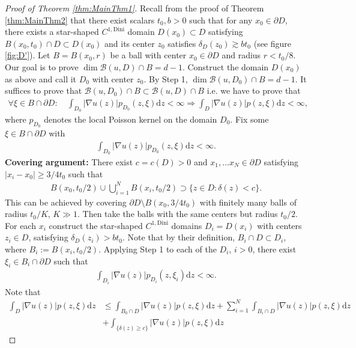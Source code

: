 \documentclass[10pt,a4paper]{amsart}
\begin{document}
\begin{proof}[Proof of Theorem \ref{thm:MainThm1}]
		Recall from the proof of Theorem \ref{thm:MainThm2} that there exist scalars $t_0,b>0$ such that for any $x_0\in\partial D$, there exists a star-shaped $C^{1,\mathrm{Dini}}$ domain $D(x_0)\subset D$ satisfying $B(x_0,t_0)\cap D\subset D(x_0)$ and its center $z_0$ satisfies $\delta_D(z_0)\gtrsim bt_0$ (see figure \ref{fig:D'}). Let $B=B(x_0,r)$ be a ball with center $x_0\in\partial D$ and radius $r<t_0/8$. Our goal is to prove $\dim\mathcal B(u,D)\cap B=d-1$. Construct the domain $D(x_0)$ as above and call it $D_0$ with center $z_0$. By Step 1, $\dim \mathcal B(u,D_0)\cap B=d-1$. It suffices to prove that $\mathcal B(u,D_0)\cap B\subset \mathcal B(u, D)\cap B$ i.e. we have to prove that
		\begin{align}
			\forall \xi\in B\cap\partial D:\quad\int_{D_0}|\nabla u(z)| p_{D_0}(z,\xi)\mathrm dz<\infty\Rightarrow\int_{D}|\nabla u(z)|p(z,\xi)\mathrm dz<\infty,
		\end{align}
		where $p_{D_0}$ denotes the local Poisson kernel on the domain $D_0$. Fix some $\xi\in B\cap\partial D$ with
		\begin{align*}
			\int_{D_0}|\nabla u(z)| p_{D_0}(z,\xi)\mathrm dz<\infty.
		\end{align*}
		\textbf{Covering argument: }There exist $c=c(D)>0$ and $x_1,\dots x_N\in\partial D$ satisfying $|x_i-x_0|\geq3/4t_0$ such that
		\begin{align}
			B(x_0,t_0/2)\cup\bigcup_{i=1}^N B(x_i,t_0/2)\supset \lbrace z\in D:\delta(z)<c\rbrace.
		\end{align}
		This can be achieved by covering $\partial D\setminus B(x_0,3/4t_0)$ with finitely many balls of radius $t_0/K$, $K\gg1$. Then take the balls with the same centers but radius $t_0/2$. For each $x_i$ construct the star-shaped $C^{1,\mathrm{Dini}}$ domains $D_i=D(x_i)$ with centers $z_i\in D$, satisfying $\delta_D(z_i)>bt_0$. Note that by their definition, $B_i\cap D\subset D_i$, where $B_i:=B(x_i,t_0/2)$. Applying Step 1 to each of the $D_i$, $i>0$, there exist $\xi_i\in B_i\cap\partial D$ such that
		\begin{align}
			\int_{D_i}|\nabla u(z)|p_{D_i}(z,\xi_i)\mathrm dz<\infty.
		\end{align}
		Note that
		\begin{align}\label{eq:JonesSplitting}
			\int_{D}|\nabla u(z)|p(z,\xi)\mathrm dz&\leq\int_{B_0\cap D}|\nabla u(z)|p(z,\xi)\mathrm dz+ \sum_{i=1}^{N}\int_{B_i\cap D}|\nabla u(z)|p(z,\xi)\mathrm dz\\
			&+\int_{\lbrace\delta(z)\geq c\rbrace}|\nabla u(z)|p(z,\xi)\mathrm dz\label{eq:finiteIntegral}

\end{align}
\end{proof}
\end{document}
